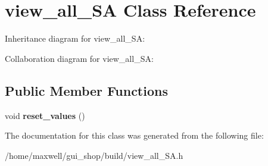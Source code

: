 \hypertarget{classview__all__SA}{}\section{view\+\_\+all\+\_\+\+SA Class Reference}
\label{classview__all__SA}


Inheritance diagram for view\+\_\+all\+\_\+\+SA\+:


Collaboration diagram for view\+\_\+all\+\_\+\+SA\+:
\subsection*{Public Member Functions}
\begin{DoxyCompactItemize}
\item 
void {\bfseries reset\+\_\+values} ()\hypertarget{classview__all__SA_a1407cfb2a8635ffd433ffcf75fb5a494}{}\label{classview__all__SA_a1407cfb2a8635ffd433ffcf75fb5a494}

\end{DoxyCompactItemize}


The documentation for this class was generated from the following file\+:\begin{DoxyCompactItemize}
\item 
/home/maxwell/gui\+\_\+shop/build/view\+\_\+all\+\_\+\+S\+A.\+h\end{DoxyCompactItemize}
